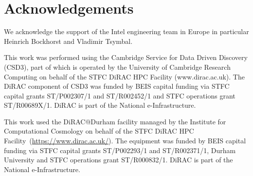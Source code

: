 \documentclass[main]{subfiles}
\begin{document}
\section{Acknowledgements}\label{sec:acknowledgments}
We acknowledge the support of the Intel engineering team in Europe in particular Heinrich Bockhorst and Vladimir Tsymbal.

This work was performed using the Cambridge Service for Data Driven Discovery (CSD3), part of which is operated by the University of Cambridge Research Computing on behalf of the STFC DiRAC HPC Facility (www.dirac.ac.uk).
The DiRAC component of CSD3 was funded by BEIS capital funding via STFC capital grants ST/P002307/1 and ST/R002452/1 and STFC operations grant ST/R00689X/1.
DiRAC is part of the National e-Infrastructure.

This work used the DiRAC@Durham facility managed by the Institute for Computational Cosmology on behalf of the STFC DiRAC HPC Facility~(\href{https://www.dirac.ac.uk/}{https://www.dirac.ac.uk/}).
The equipment was funded by BEIS capital funding via STFC capital grants ST/P002293/1 and ST/R002371/1, Durham University and STFC operations grant ST/R000832/1.
DiRAC is part of the National e-Infrastructure.
\end{document}
